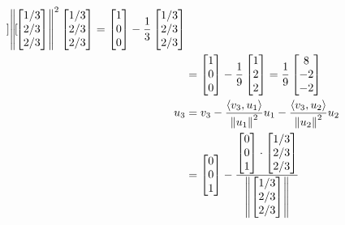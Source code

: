 \begin{solution}
\begin{align*}
{\begin{bmatrix}
		\end{bmatrix}
		}{\norm{
		\begin{bmatrix}
			1/3 \\ 2/3 \\ 2/3
		\end{bmatrix}
		}^{2}}
		\begin{bmatrix}
			1/3 \\ 2/3 \\ 2/3
		\end{bmatrix}
		=
		\begin{bmatrix}
			1 \\ 0 \\ 0
		\end{bmatrix}
		-\dfrac{1}{3}
		\begin{bmatrix}
			1/3 \\ 2/3 \\ 2/3
		\end{bmatrix}\\
		&=
		\begin{bmatrix}
			1 \\ 0 \\ 0
		\end{bmatrix}
		-\dfrac{1}{9}
		\begin{bmatrix}
			1 \\ 2 \\ 2
		\end{bmatrix}
		=\dfrac{1}{9}
		\begin{bmatrix}
			8 \\ -2 \\ -2
		\end{bmatrix}\\
		u_{3} &= v_{3} - \dfrac{\inprod{v_{3}, u_{1}}}{\norm{u_{1}}^{2}}u_{1} - \dfrac{\inprod{v_{3}, u_{2}}}{\norm{u_{2}}^{2}}u_{2}\\
		&=
		\begin{bmatrix}
			0 \\ 0 \\ 1
		\end{bmatrix}
		-
		\dfrac{
		\begin{bmatrix}
			0 \\ 0 \\ 1
		\end{bmatrix}
		\cdot
		\begin{bmatrix}
			1/3 \\ 2/3 \\ 2/3
		\end{bmatrix}
		}{\norm{
		\begin{bmatrix}
			1/3 \\ 2/3 \\ 2/3

\end{bmatrix}}}
\end{align*}
\end{solution}
